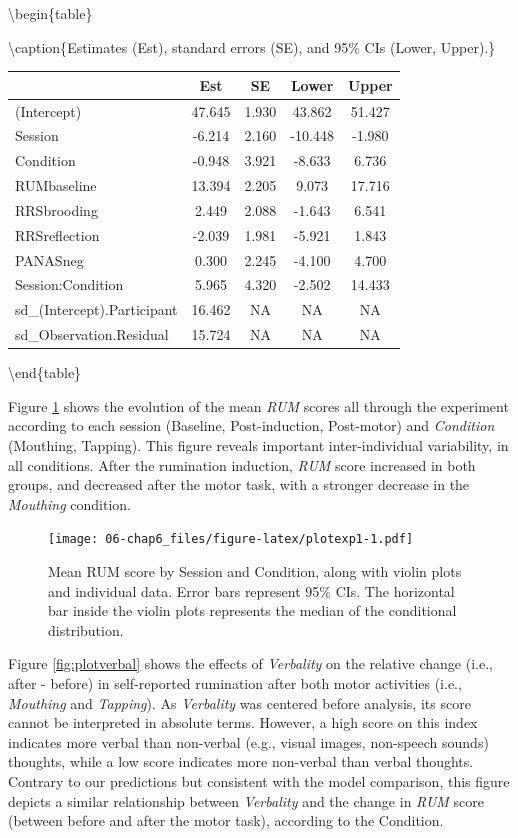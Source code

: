 \documentclass[12pt,]{book}
\theoremstyle{definition}
\theoremstyle{definition}
\theoremstyle{definition}
\theoremstyle{remark}
\begin{document}
\textbackslash{}begin\{table\}

\textbackslash{}caption\{\label{tab:paramexp2}Estimates (Est), standard
errors (SE), and 95\% CIs (Lower, Upper).\} \centering

\begin{tabular}[t]{l|c|c|c|c}
\hline
 & Est & SE & Lower & Upper\\
\hline
(Intercept) & 47.645 & 1.930 & 43.862 & 51.427\\
\hline
Session & -6.214 & 2.160 & -10.448 & -1.980\\
\hline
Condition & -0.948 & 3.921 & -8.633 & 6.736\\
\hline
RUMbaseline & 13.394 & 2.205 & 9.073 & 17.716\\
\hline
RRSbrooding & 2.449 & 2.088 & -1.643 & 6.541\\
\hline
RRSreflection & -2.039 & 1.981 & -5.921 & 1.843\\
\hline
PANASneg & 0.300 & 2.245 & -4.100 & 4.700\\
\hline
Session:Condition & 5.965 & 4.320 & -2.502 & 14.433\\
\hline
sd\_(Intercept).Participant & 16.462 & NA & NA & NA\\
\hline
sd\_Observation.Residual & 15.724 & NA & NA & NA\\
\hline
\end{tabular}

\textbackslash{}end\{table\}

Figure \ref{fig:plotexp1} shows the evolution of the mean \emph{RUM}
scores all through the experiment according to each session (Baseline,
Post-induction, Post-motor) and \emph{Condition} (Mouthing, Tapping).
This figure reveals important inter-individual variability, in all
conditions. After the rumination induction, \emph{RUM} score increased
in both groups, and decreased after the motor task, with a stronger
decrease in the \emph{Mouthing} condition.

\begin{figure}
\centering
\texttt{[image: 06-chap6\_files/figure-latex/plotexp1-1.pdf]}
\caption{\label{fig:plotexp1}Mean RUM score by Session and Condition, along
with violin plots and individual data. Error bars represent 95\% CIs.
The horizontal bar inside the violin plots represents the median of the
conditional distribution.}
\end{figure}

Figure \ref{fig:plotverbal} shows the effects of \emph{Verbality} on the
relative change (i.e., after - before) in self-reported rumination after
both motor activities (i.e., \emph{Mouthing} and \emph{Tapping}). As
\emph{Verbality} was centered before analysis, its score cannot be
interpreted in absolute terms. However, a high score on this index
indicates more verbal than non-verbal (e.g., visual images, non-speech
sounds) thoughts, while a low score indicates more non-verbal than
verbal thoughts. Contrary to our predictions but consistent with the
model comparison, this figure depicts a similar relationship between
\emph{Verbality} and the change in \emph{RUM} score (between before and
after the motor task), according to the Condition.
\end{document}
